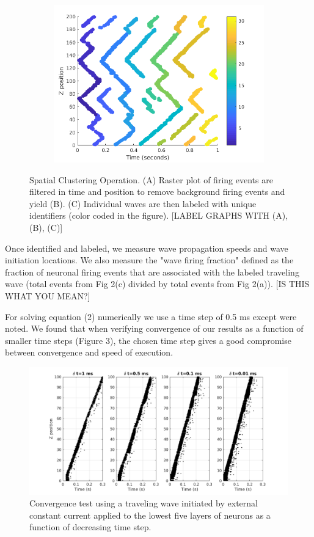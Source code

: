 \documentclass[a4paper,11pt]{article}
\begin{document}
\begin{figure}[!htb]
\begin{subfigure}{0.33\textwidth}
 \end{subfigure}%
 \begin{subfigure}{0.33\textwidth}
  \centering
  \includegraphics[width=\textwidth]{fig/2x2_wave_IDs}
 \end{subfigure}%
 \caption{Spatial Clustering Operation. (A) Raster plot of firing events are filtered in time and position to remove background firing events and yield (B). (C) Individual waves are then labeled with unique identifiers (color coded in the figure). [LABEL GRAPHS WITH (A), (B), (C)]}
 \label{fig:wave_analysis}
\end{figure}

Once identified and labeled, we measure wave propagation speeds and wave initiation locations. 
We also measure the "wave firing fraction" defined as the fraction of neuronal firing events that are associated with the labeled traveling wave (total events from Fig 2(c) divided by total events from Fig 2(a)). 
[IS THIS WHAT YOU MEAN?] 

For solving equation (2) numerically we use a time step of 0.5 ms except were noted. 
We found that when verifying convergence of our results as a function of smaller time steps (Figure 3), the chosen time step gives a good compromise between convergence and speed of execution.
\begin{figure}[!htb]
 \centering
 \includegraphics[width=\textwidth]{fig/TimeStepEffect}
  \caption{Convergence test using a traveling wave initiated by external constant current applied to the lowest five layers of neurons as a function of decreasing time step.}
 \label{fig:time_step}
\end{figure}
\end{document}

